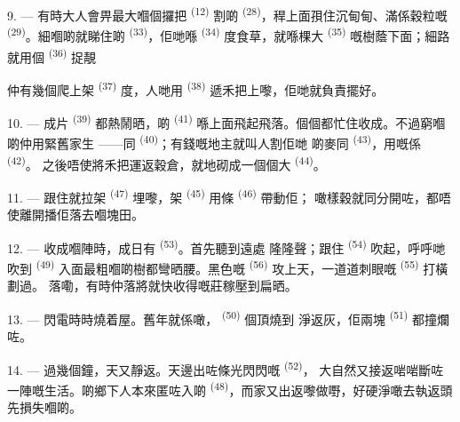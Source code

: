 9. --- 有時大人會畀最大嗰個攞把 \textsuperscript{(12)} 割啲
 \textsuperscript{(28)}，稈上面孭住沉甸甸、滿係穀粒嘅
\textsuperscript{(29)}。細嗰啲就睇住啲 \textsuperscript{(33)}，佢哋喺
 \textsuperscript{(34)} 度食草，就喺棵大 \textsuperscript{(35)}
嘅樹蔭下面；細路就用個 \textsuperscript{(36)} 捉靚

仲有幾個爬上架 \textsuperscript{(37)} 度，人哋用
\textsuperscript{(38)} 遞禾把上嚟，佢哋就負責擺好。

10. --- 成片 \textsuperscript{(39)} 都熱鬧晒，啲
\textsuperscript{(41)} 喺上面飛起飛落。個個都忙住收成。不過窮嗰啲仲用緊舊家生
——同 \textsuperscript{(40)}；有錢嘅地主就叫人割佢哋
啲麥同 \textsuperscript{(43)}，用嘅係 \textsuperscript{(42)}。
之後唔使將禾把運返穀倉，就地砌成一個個大 \textsuperscript{(44)}。

11. --- 跟住就拉架 \textsuperscript{(47)} 埋嚟，架
 \textsuperscript{(45)} 用條 \textsuperscript{(46)} 帶動佢；
噉樣穀就同分開咗，都唔使離開播佢落去嗰塊田。

\VUsaut{5.0mm}
\VUsaut{3.4mm}

12. --- 收成嗰陣時，成日有 \textsuperscript{(53)}。首先聽到遠處
隆隆聲；跟住 \textsuperscript{(54)} 吹起，呼呼哋
吹到 \textsuperscript{(49)} 入面最粗嗰啲樹都彎晒腰。黑色嘅
\textsuperscript{(56)} 攻上天，一道道刺眼嘅 \textsuperscript{(55)} 打橫劃過。
落嘞，有時仲落將就快收得嘅莊稼壓到扁晒。

13. --- 閃電時時燒着屋。舊年就係噉， \textsuperscript{(50)} 個頂燒到
淨返灰，佢兩塊 \textsuperscript{(51)} 都撞爛咗。

14. --- 過幾個鐘，天又靜返。天邊出咗條光閃閃嘅 \textsuperscript{(52)}，
大自然又接返啱啱斷咗一陣嘅生活。啲鄉下人本來匿咗入啲
\textsuperscript{(48)}，而家又出返嚟做嘢，好硬淨噉去執返頭先損失嗰啲。

\VUsaut{6.0mm}
\VUsaut{3.6mm}

\VUsaut{1.4mm}
\VUsaut{4.0mm}

